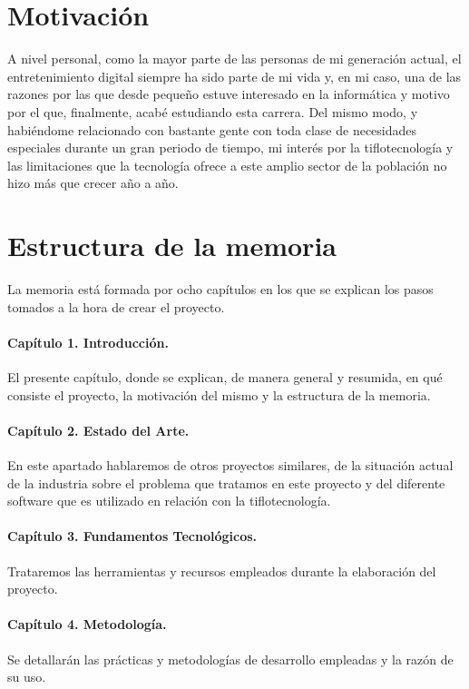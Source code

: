 \section{Motivación}
A nivel personal, como la mayor parte de las personas de mi generación actual, el entretenimiento digital siempre ha sido parte de mi vida y, en mi caso, una de las razones por las que desde pequeño estuve interesado en la informática y motivo por el que, finalmente, acabé estudiando esta carrera. Del mismo modo, y habiéndome relacionado con bastante gente con toda clase de necesidades especiales durante un gran periodo de tiempo, mi interés por la tiflotecnología y las limitaciones que la tecnología ofrece a este amplio sector de la población no hizo más que crecer año a año.

\section{Estructura de la memoria}

La memoria está formada por ocho capítulos en los que se explican los pasos tomados a la hora de crear el proyecto.

\paragraph*{Capítulo 1. Introducción.}
El presente capítulo, donde se explican, de manera general y resumida, en qué consiste el proyecto, la motivación del mismo y la estructura de la memoria.

\paragraph*{Capítulo 2. Estado del Arte.}
En este apartado hablaremos de otros proyectos similares, de la situación actual de la industria sobre el problema que tratamos en este proyecto y del diferente software que es utilizado en relación con la tiflotecnología.

\paragraph*{Capítulo 3. Fundamentos Tecnológicos.}
Trataremos las herramientas y recursos empleados durante la elaboración del proyecto.

\paragraph*{Capítulo 4. Metodología.}
Se detallarán las prácticas y metodologías de desarrollo empleadas y la razón de su uso.

